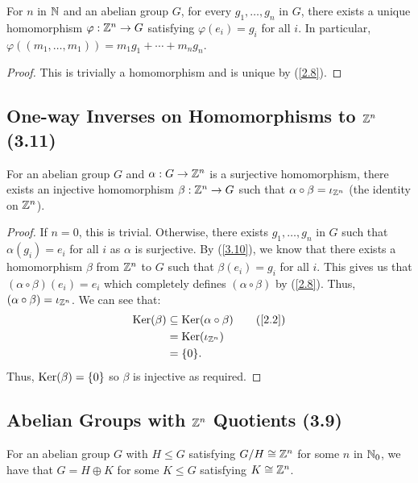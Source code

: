 For $n$ in $\mathbb{N}$ and an abelian group $G$, for every $g_1, \ldots, g_n$
in $G$, there exists a unique homomorphism $\varphi : \mathbb{Z}^n \to G$
satisfying $\varphi(e_i) = g_i$ for all $i$. In particular,
$\varphi((m_1, \ldots, m_1)) = m_1g_1 + \cdots + m_ng_n$.

\begin{proof}
    This is trivially a homomorphism and is unique by (\ref{2.8}).
\end{proof}

\subsection{One-way Inverses on Homomorphisms to $\mathbb{Z}^n$ (3.11)} \label{3.11}

For an abelian group $G$ and $\alpha : G \to \mathbb{Z}^n$ is a surjective
homomorphism, there exists an injective homomorphism $\beta : \mathbb{Z}^n \to G$
such that $\alpha \circ \beta = \iota_{\mathbb{Z}^n}$ (the identity on $\mathbb{Z}^n$).

\begin{proof}
    If $n = 0$, this is trivial. Otherwise, there exists $g_1, \ldots, g_n$
    in $G$ such that $\alpha(g_i) = e_i$ for all $i$ as $\alpha$ is surjective.
    By (\ref{3.10}), we know that there exists a homomorphism $\beta$
    from $\mathbb{Z}^n$ to $G$ such that $\beta(e_i) = g_i$ for all $i$.
    This gives us that $(\alpha \circ \beta)(e_i) = e_i$ which completely defines
    $(\alpha \circ \beta)$ by (\ref{2.8}). Thus, $(\alpha \circ \beta) = \iota_{\mathbb{Z}^n}$.
    We can see that: \begin{align*}
        \Ker(\beta) &\subseteq \Ker(\alpha \circ \beta) \tag{\ref{2.2}} \\
        &= \Ker(\iota_{\mb{Z}^n}) \\
        &= \{0\}.
    \end{align*} Thus, $\operatorname{Ker}(\beta) = \{0\}$ so $\beta$ is injective as
    required.
\end{proof}

\subsection{Abelian Groups with $\mathbb{Z}^n$ Quotients (3.9)} \label{3.9}

For an abelian group $G$ with $H \leq G$ satisfying $G/H \cong \mathbb{Z}^n$
for some $n$ in $\mathbb{N}_0$, we have that $G = H \oplus K$ for some $K \leq G$
satisfying $K \cong \mathbb{Z}^n$.


